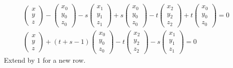 \documentclass[twoside]{amsart}
\theoremstyle{plain}
\theoremstyle{definition}
\begin{document}
\begin{enumerate}
\[\begin{gathered}
  \left( \begin{matrix} x \\ y \\ z \end{matrix} \right) - \left( \begin{matrix} x_0 \\ y_0 \\ z_0 \end{matrix} \right) - s \left( \begin{matrix} x_1 \\ y_1 \\ z_1 \end{matrix} \right) + s \left( \begin{matrix} x_0 \\ y_0 \\ z_0 \end{matrix} \right) - t \left( \begin{matrix} x_2 \\ y_2 \\ z_2 \end{matrix} \right)  + t \left( \begin{matrix} x_0 \\ y_0 \\ z_0 \end{matrix} \right) = 0 \\
  \left( \begin{matrix} x \\ y \\ z \end{matrix} \right) + (t+s-1) \left( \begin{matrix} x_0 \\ y_0 \\ z_0 \end{matrix} \right) -t \left( \begin{matrix} x_2 \\ y_2 \\ z_2 \end{matrix} \right) - s\left( \begin{matrix} x_1 \\ y_1 \\ z_1 \end{matrix} \right) = 0 
\end{gathered}
\]
Extend by $1$ for a new row.  
\[
\]
\end{enumerate}
\end{document}

